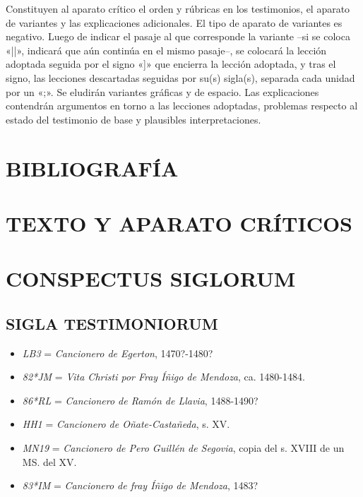 \documentclass[11pt,a4paper,twoside]{article}
\newcommand{\comillas}[1]{«#1»}
\begin{document}
%
Constituyen al aparato crítico el orden y rúbricas en los testimonios, el aparato de variantes y las explicaciones adicionales. El tipo de aparato de variantes es negativo. Luego de indicar el pasaje al que corresponde la variante --si se coloca \comillas{||}, indicará que aún continúa en el mismo pasaje--, se colocará la lección adoptada seguida por el signo \comillas{]} que encierra la lección adoptada, y tras el signo, las lecciones descartadas seguidas por su(s) sigla(s), separada cada unidad por un \comillas{;}. Se eludirán variantes gráficas y de espacio. Las explicaciones contendrán argumentos en torno a las lecciones adoptadas, problemas respecto al estado del testimonio de base y plausibles interpretaciones.\par

\section*{\centering\fontsize{11}{14}\selectfont BIBLIOGRAFÍA}
\nocite{*}
\printbibliography[heading=none]
\newpage

\section*{\centering\fontsize{13}{14}\selectfont TEXTO Y APARATO CRÍTICOS}
\newpage

\section*{\centering\fontsize{11}{14.35}\selectfont CONSPECTUS SIGLORUM}

\subsection*{\centering\fontsize{9.5}{12}\selectfont SIGLA TESTIMONIORUM}
\vspace*{-2.5pt}
\begin{itemize}[label=,leftmargin=0.6cm]%
\item \textit{LB3} = \textit{Cancionero de Egerton}, 1470?-1480?
\item \textit{82*JM} = \textit{Vita Christi por Fray Íñigo de Mendoza}, ca. 1480-1484.
\item \textit{86*RL} = \textit{Cancionero de Ramón de Llavia}, 1488-1490?
\item \textit{HH1} = \textit{Cancionero de Oñate-Castañeda}, s. XV.
\item \textit{MN19} = \textit{Cancionero de Pero Guillén de Segovia}, copia del s. XVIII de un MS. del XV.
\item \textit{83*IM} = \textit{Cancionero de fray Íñigo de Mendoza}, 1483?%
\end{itemize}
\end{document}
